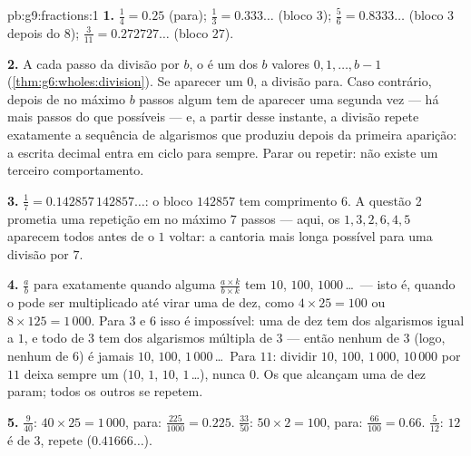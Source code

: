 \begin{solution}{pb:g9:fractions:1}
\textbf{1.} $\frac14 = 0.25$ (para); $\frac13 = 0.333\ldots$ (bloco
$3$); $\frac56 = 0.8333\ldots$ (bloco $3$ depois do $8$);
$\frac{3}{11} = 0.272727\ldots$ (bloco $27$).

\textbf{2.} A cada passo da divisão por $b$, o  é um dos $b$
valores $0, 1, \dots, b - 1$ (\cref{thm:g6:wholes:division}). Se
aparecer um  $0$, a divisão para. Caso contrário, depois de no
máximo $b$ passos algum  tem de aparecer uma segunda vez --- há
mais passos do que  possíveis --- e, a partir desse instante, a
divisão repete exatamente a sequência de algarismos que produziu depois
da primeira aparição: a escrita decimal entra em ciclo para sempre.
Parar ou repetir: não existe um terceiro comportamento.

\textbf{3.} $\frac17 = 0.142857\,142857\ldots$: o bloco $142857$ tem
comprimento $6$. A questão 2 prometia uma repetição em no máximo $7$
passos --- aqui, os  $1, 3, 2, 6, 4, 5$ aparecem todos antes de o
$1$ voltar: a cantoria mais longa possível para uma divisão por $7$.

\textbf{4.} $\frac ab$ para exatamente quando alguma
$\frac{a \times k}{b \times k}$ tem  $10$, $100$,
$1000$\,\dots\ --- isto é, quando o  pode ser multiplicado
até virar uma  de dez, como $4 \times 25 = 100$ ou
$8 \times 125 = 1\,000$. Para $3$ e $6$ isso é impossível: uma 
de dez tem  dos algarismos igual a $1$, e todo  de $3$ tem
 dos algarismos múltipla de $3$ --- então nenhum  de $3$
(logo, nenhum de $6$) é jamais $10$, $100$, $1\,000$\,\dots\ Para
$11$: dividir $10$, $100$, $1\,000$, $10\,000$ por $11$ deixa sempre um
 ($10$, $1$, $10$, $1$\,\dots), nunca $0$. Os  que
alcançam uma  de dez param; todos os outros se repetem.

\textbf{5.} $\frac{9}{40}$: $40 \times 25 = 1\,000$, para:
$\frac{225}{1000} = 0.225$. $\frac{33}{50}$: $50 \times 2 = 100$,
para: $\frac{66}{100} = 0.66$. $\frac{5}{12}$: $12$ é  de $3$,
repete ($0.41666\ldots$).


\end{solution}
